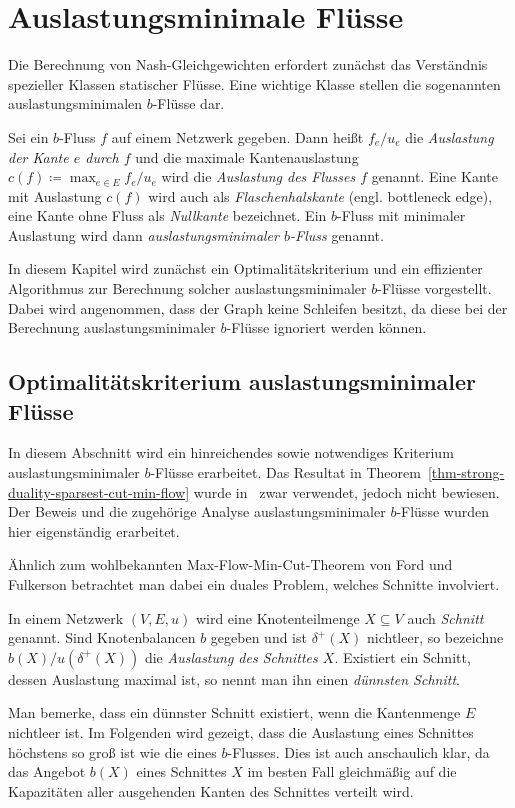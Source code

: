 \chapter{Auslastungsminimale Flüsse}\label{chapter-min-con-flows}

Die Berechnung von Nash-Gleichgewichten erfordert zunächst das Verständnis spezieller Klassen statischer Flüsse.
Eine wichtige Klasse stellen die sogenannten auslastungsminimalen $b$-Flüsse dar.

\begin{definition}
	Sei ein $b$-Fluss $f$ auf einem Netzwerk gegeben.
	Dann heißt $f_e/u_e$ die \emph{Auslastung der Kante $e$ durch $f$} und die maximale Kantenauslastung $c(f)\coloneq \max_{e\in E} f_e/u_e$ wird die \emph{Auslastung des Flusses $f$} genannt.
	Eine Kante mit Auslastung $c(f)$ wird auch als \emph{Flaschenhalskante} (engl. bottleneck edge), eine Kante ohne Fluss als \emph{Nullkante} bezeichnet.
	Ein $b$-Fluss mit minimaler Auslastung wird dann \emph{auslastungsminimaler $b$-Fluss} genannt.
\end{definition}

In diesem Kapitel wird zunächst ein Optimalitätskriterium und ein effizienter Algorithmus zur Berechnung solcher auslastungsminimaler $b$-Flüsse vorgestellt.
Dabei wird angenommen, dass der Graph keine Schleifen besitzt, da diese bei der Berechnung auslastungsminimaler $b$-Flüsse ignoriert werden können.

\section{Optimalitätskriterium auslastungsminimaler Flüsse}

In diesem Abschnitt wird ein hinreichendes sowie notwendiges Kriterium auslastungsminimaler $b$-Flüsse erarbeitet.
Das Resultat in Theorem~\ref{thm-strong-duality-sparsest-cut-min-flow} wurde in~\cite[Theorem 6.11]{Koch2012} zwar verwendet, jedoch nicht bewiesen.
Der Beweis und die zugehörige Analyse auslastungsminimaler $b$-Flüsse wurden hier eigenständig erarbeitet.

Ähnlich zum wohlbekannten Max-Flow-Min-Cut-Theorem von Ford und Fulkerson betrachtet man dabei ein duales Problem, welches Schnitte involviert.

\begin{definition}
	In einem Netzwerk $(V, E, u)$ wird eine Knotenteilmenge $X\subseteq V$ auch \emph{Schnitt} genannt.
	Sind Knotenbalancen $b$ gegeben und ist $\delta^+(X)$ nichtleer, so bezeichne $b(X) / u(\delta^+(X))$ die \emph{Auslastung des Schnittes $X$}.
	Existiert ein Schnitt, dessen Auslastung maximal ist, so nennt man ihn einen \emph{dünnsten Schnitt}.
\end{definition}
Man bemerke, dass ein dünnster Schnitt existiert, wenn die Kantenmenge $E$ nichtleer ist.
Im Folgenden wird gezeigt, dass die Auslastung eines Schnittes höchstens so groß ist wie die eines $b$-Flusses.
Dies ist auch anschaulich klar, da das Angebot $b(X)$ eines Schnittes $X$ im besten Fall gleichmäßig auf die Kapazitäten aller ausgehenden Kanten des Schnittes verteilt wird.

